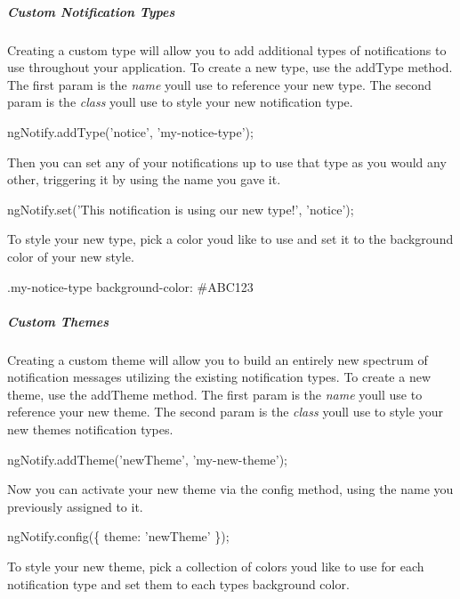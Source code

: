 \subparagraph*{Custom Notification Types}

Creating a custom type will allow you to add additional types of notifications to use throughout your application. To create a new type, use the {\ttfamily add\+Type} method. The first param is the {\itshape name} you\textquotesingle{}ll use to reference your new type. The second param is the {\itshape class} you\textquotesingle{}ll use to style your new notification type.


\begin{DoxyCode}
ngNotify.addType('notice', 'my-notice-type');
\end{DoxyCode}


Then you can set any of your notifications up to use that type as you would any other, triggering it by using the name you gave it.


\begin{DoxyCode}
ngNotify.set('This notification is using our new type!', 'notice');
\end{DoxyCode}


To style your new type, pick a color you\textquotesingle{}d like to use and set it to the background color of your new style.


\begin{DoxyCode}
.my-notice-type
    background-color: #ABC123
\end{DoxyCode}


\subparagraph*{Custom Themes}

Creating a custom theme will allow you to build an entirely new spectrum of notification messages utilizing the existing notification types. To create a new theme, use the {\ttfamily add\+Theme} method. The first param is the {\itshape name} you\textquotesingle{}ll use to reference your new theme. The second param is the {\itshape class} you\textquotesingle{}ll use to style your new theme\textquotesingle{}s notification types.


\begin{DoxyCode}
ngNotify.addTheme('newTheme', 'my-new-theme');
\end{DoxyCode}


Now you can activate your new theme via the config method, using the name you previously assigned to it.


\begin{DoxyCode}
ngNotify.config(\{
    theme: 'newTheme'
\});
\end{DoxyCode}


To style your new theme, pick a collection of colors you\textquotesingle{}d like to use for each notification type and set them to each type\textquotesingle{}s background color.


